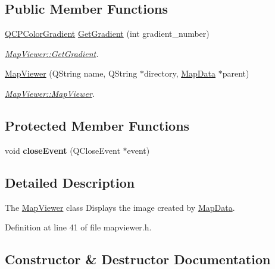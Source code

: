 \subsection*{Public Member Functions}
\begin{DoxyCompactItemize}
\item 
\hyperlink{class_q_c_p_color_gradient}{Q\+C\+P\+Color\+Gradient} \hyperlink{class_map_viewer_a9a1662d27539b588c2702f8564f8fb3c}{Get\+Gradient} (int gradient\+\_\+number)
\begin{DoxyCompactList}\small\item\em \hyperlink{class_map_viewer_a9a1662d27539b588c2702f8564f8fb3c}{Map\+Viewer\+::\+Get\+Gradient}. \end{DoxyCompactList}\item 
\hyperlink{class_map_viewer_a1119962bac763f5849517f0a88b36e64}{Map\+Viewer} (Q\+String name, Q\+String $\ast$directory, \hyperlink{class_map_data}{Map\+Data} $\ast$parent)
\begin{DoxyCompactList}\small\item\em \hyperlink{class_map_viewer_a1119962bac763f5849517f0a88b36e64}{Map\+Viewer\+::\+Map\+Viewer}. \end{DoxyCompactList}\end{DoxyCompactItemize}
\subsection*{Protected Member Functions}
\begin{DoxyCompactItemize}
\item 
void {\bfseries close\+Event} (Q\+Close\+Event $\ast$event)\hypertarget{class_map_viewer_a9c0d036ff4695a6da7a2827e6c646c64}{}\label{class_map_viewer_a9c0d036ff4695a6da7a2827e6c646c64}

\end{DoxyCompactItemize}


\subsection{Detailed Description}
The \hyperlink{class_map_viewer}{Map\+Viewer} class Displays the image created by \hyperlink{class_map_data}{Map\+Data}. 

Definition at line 41 of file mapviewer.\+h.



\subsection{Constructor \& Destructor Documentation}
